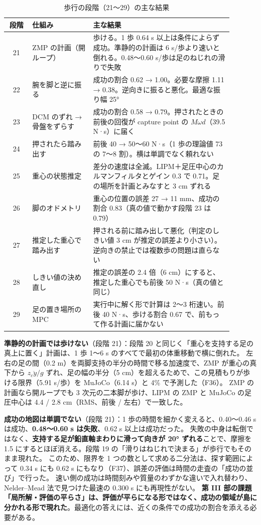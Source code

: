 \documentclass[paper=a4paper,fontsize=10pt,twocolumn,column_gap=2zw,line_length=24zw,number_of_lines=46,head_space=20mm]{jlreq}
\begin{document}
\begin{table}[t]\centering\small
\caption{歩行の段階（21〜29）の主な結果}\label{tab:walk}
\setlength{\tabcolsep}{2pt}
\begin{tabular}{@{}cp{0.27\linewidth}p{0.62\linewidth}@{}}\toprule
段階 & 仕組み & 主な結果 \\\midrule
21 & ZMP の計画（開ループ） & 歩ける。1 歩 0.64 s 以上は条件によらず成功。準静的の計画は 6 s/歩より速いと倒れる。0.48〜0.60 s/歩は足のねじれの滑りで失敗 \\
22 & 腕を脚と逆に振る & 成功の割合 0.62 → 1.00。必要な摩擦 1.11 → 0.38。逆向きに振ると悪化。最適な振り幅 25° \\
23 & DCM のずれ → 骨盤をずらす & 成功の割合 0.58 → 0.79。押されたときの前後の回復が capture point の $M\omega d$（39.5 N·s）に届く \\
24 & 押されたら踏み出す & 前後 40 → 50〜60 N·s（1 歩の理論値 73 の 7〜8 割）。横は単調でなく頼れない \\
25 & 重心の状態推定 & 差分の速度は全滅。LIPM＋足圧中心のカルマンフィルタとゲイン 0.3 で 0.71。足の場所を計画とみなすと 3 cm ずれる \\
26 & 脚のオドメトリ & 重心の位置の誤差 27 → 11 mm、成功の割合 0.83（真の値で動かす段階 23 は 0.79） \\
27 & 推定した重心で踏み出す & 押される前に踏み出して悪化（判定のしきい値 3 cm が推定の誤差より小さい）。逆向きの禁止では複数歩の問題は直らない \\
28 & しきい値の決め直し & 推定の誤差の 2.4 倍（6 cm）にすると、推定した重心でも前後 50 N·s（真の値と同じ） \\
29 & 足の置き場所の MPC & 実行中に解く形で計算は 2〜3 桁速い。前後 40 N·s、歩ける割合 0.67 で、前もって作る計画に届かない \\\bottomrule
\end{tabular}
\end{table}

\textbf{準静的の計画では歩けない}（段階 21）：段階 20 と同じく「重心を支持する足の真上に置く」計画は、1 歩 1〜6 s のすべてで最初の体重移動で横に倒れた。
左右の足の間（0.2 m）を両脚支持の半分の時間で移る加速度で、ZMP が重心の真下から $z_c\ddot{y}/g$ ずれ、足の幅の半分（5 cm）を超えるためで、この見積もりが歩ける限界（5.91 s/歩）を MuJoCo（6.14 s）と 4\% で予測した（F36）。
ZMP の計画なら開ループでも 3 次元の二本脚が歩け、LIPM の ZMP と MuJoCo の足圧中心は 4.4 / 2.8 cm（RMS、前後 / 左右）で一致した。

\textbf{成功の地図は単調でない}（段階 21）：1 歩の時間を細かく変えると、0.40〜0.46 s は成功、\textbf{0.48〜0.60 s は失敗}、0.62 s 以上は成功だった。
失敗の中身は転倒ではなく、\textbf{支持する足が鉛直軸まわりに滑って向きが 20° ずれる}ことで、摩擦を 1.5 にするとほぼ消える。段階 19 の「滑りはねじれで決まる」が歩行でもそのまま現れた。
このため、限界を 1 つの数として求める二分法は、探す範囲によって 0.34 s にも 0.62 s にもなり（F37）、誤差の評価は時間の走査の「成功の並び」で行った。
速い側の成功は時間刻みや質量のわずかな違いで入れ替わり、Nelder--Mead 法で見つけた最速の 0.300 s にも再現性がない。
\textbf{第 III 部の課題「局所解・評価の平らさ」は、評価が平らになる形ではなく、成功の領域が島に分かれる形で現れた}。最適化の答えには、近くの条件での成功の割合を添える必要がある。
\end{document}

